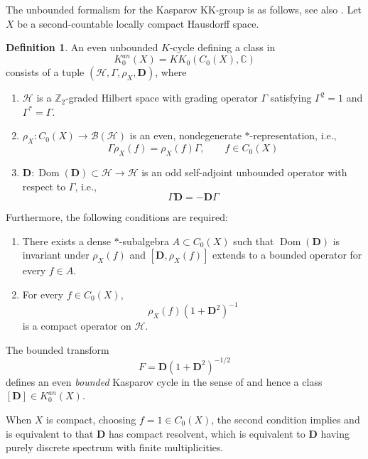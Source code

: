 \documentclass[11pt,leqno,twoside]{amsart}
\theoremstyle{plainsl}
\theoremstyle{definition}
\newtheorem{definition}[theorem]{Definition}
\newcommand{\C}{\mathbb{C}}
\newcommand{\bD}{\mathbf{D}}
\begin{document}
The unbounded formalism for the Kasparov KK-group \cite{BJ} is as follows, see also \cite{Bl}. Let $X$ be a second-countable locally compact Hausdorff space.




\begin{definition}\label{kkdef}\cite{BJ}
An even unbounded $K$-cycle defining a class in
\[
K_0^{an}(X)=KK_0(C_0(X),\C)
\]
consists of a tuple $(\mathcal H,\Gamma,\rho_X,\bD)$, where
\begin{enumerate}[label=(\alph*)]
    \item $\mathcal H$ is a $\mathbb Z_2$-graded Hilbert
    space with grading operator $\Gamma$ satisfying
    $\Gamma^2=1$ and $\Gamma^*=\Gamma$.

    \item $\rho_X:C_0(X)\to\mathcal B(\mathcal H)$ is
    an even, nondegenerate $\ast$-representation, i.e.,
    \[
    \Gamma\rho_X(f)=\rho_X(f)\Gamma,
    \qquad f\in C_0(X)
    \]

    \item $\bD:\operatorname{Dom}(\bD)\subset\mathcal H
    \to\mathcal H$ is an odd self-adjoint unbounded
    operator with respect to $\Gamma$, i.e.,
    \[
    \Gamma\bD=-\bD\Gamma
    \]
\end{enumerate}
Furthermore, the following conditions are required:
\begin{enumerate}
    \item There exists a dense $\ast$-subalgebra
    $A\subset C_0(X)$ such that
    $\operatorname{Dom}(\bD)$ is invariant under
    $\rho_X(f)$ and $[\bD,\rho_X(f)]$ extends
    to a bounded operator for every $f\in A$.

    \item For every $f\in C_0(X)$,
    \[
    \rho_X(f)(1+\bD^2)^{-1}
    \]
    is a compact operator on $\mathcal H$.
\end{enumerate}
The bounded transform
\[
F=\bD(1+\bD^2)^{-1/2}
\]
defines an even \textit{bounded} Kasparov cycle in the sense of \cite{K} and hence a class
$[\bD]\in K_0^{an}(X)$.

When $X$ is compact, choosing $f=1\in C_0(X)$, the second condition implies and is equivalent to that $\bD$ has compact resolvent, which is equivalent to $\bD$ having purely discrete spectrum with finite multiplicities. 
\end{definition}
\end{document}
